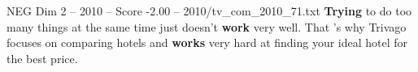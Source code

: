 \begin{textsample}{NEG Dim 2 – 2010 – Score -2.00 – 2010/tv\_com\_2010\_71.txt}  \label{ex:f2_neg_054}
\textbf{Trying} to do too many things at the same time just doesn't \textbf{work} very well.
That 's why Trivago focuses on comparing hotels and \textbf{works} very hard at finding your ideal hotel for the best price.

\end{textsample}
